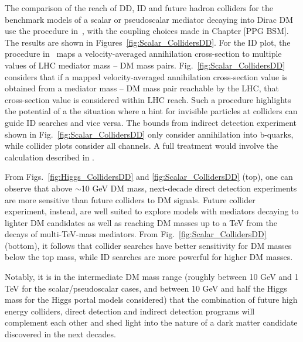 \documentclass[../report.tex]{subfiles}
\begin{document}
The comparison of the reach of DD, ID and future hadron colliders for the benchmark models of a scalar or pseudoscalar mediator decaying into Dirac DM use the procedure in~\cite{Boveia:2016mrp}, with the coupling choices made in Chapter [PPG BSM]. The results are shown in Figures~\ref{fig:Scalar_CollidersDD}. 
For the ID plot, the procedure in~\cite{Boveia:2016mrp} maps a velocity-averaged annihilation cross-section to multiple values of LHC mediator mass -- DM mass pairs.
Fig.~\ref{fig:Scalar_CollidersDD} considers that if a mapped velocity-averaged annihilation cross-section value is obtained from a mediator mass -- DM mass pair reachable by the LHC, that cross-section value is considered within LHC reach. 
Such a procedure highlights the potential of a 
the situation where a hint for invisible particles at colliders can guide ID searches and vice versa. 
The bounds from indirect detection experiment shown in Fig.~\ref{fig:Scalar_CollidersDD} only consider annihilation into b-quarks, while collider plots consider all channels. A full treatment would involve the calculation described in \cite{Carpenter:2016thc}. 

From Figs.~\ref{fig:Higgs_CollidersDD} and \ref{fig:Scalar_CollidersDD} (top), one can observe that above $\sim$10 GeV DM mass, next-decade direct detection experiments are more sensitive than future colliders to DM signals. Future collider experiment, instead, are well  suited to explore models with mediators decaying to lighter DM candidates as well as reaching DM masses up to a TeV from the decays of multi-TeV-mass mediators.
From Fig.~\ref{fig:Scalar_CollidersDD} (bottom), it follows that collider searches have better sensitivity for DM masses below the top mass, while ID searches are more powerful for higher DM masses.  

Notably, it is in the intermediate DM mass range (roughly between 10 GeV and 1 TeV for the scalar/pseudoscalar cases, and between 10 GeV and half the Higgs mass for the Higgs portal models considered) that the combination of future high energy colliders, direct detection and indirect detection programs will complement each other and shed light into the nature of a dark matter candidate discovered in the next decades. 

\end{document}
